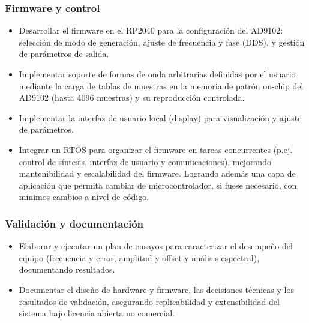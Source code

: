 \subsubsection{Firmware y control}
\begin{itemize}
	\item Desarrollar el firmware en el RP2040 para la configuración del AD9102: selección de modo de generación, ajuste de frecuencia y fase (DDS), y gestión de parámetros de salida.
	\item Implementar soporte de formas de onda arbitrarias definidas por el usuario mediante la carga de tablas de muestras en la memoria de patrón on-chip del AD9102 (hasta 4096 muestras) y su reproducción controlada.
	\item Implementar la interfaz de usuario local (display) para visualización y ajuste de parámetros.
 	\item Integrar un RTOS para organizar el firmware en tareas concurrentes (p.ej. control de síntesis, interfaz de usuario y comunicaciones), mejorando mantenibilidad y escalabilidad del firmware. Logrando además una capa de aplicación que permita cambiar de microcontrolador, si fuese necesario, con mínimos cambios a nivel de código. 
\end{itemize}

\subsubsection{Validación y documentación}
\begin{itemize}
	\item Elaborar y ejecutar un plan de ensayos para caracterizar el desempeño del equipo (frecuencia y error, amplitud y offset y análisis espectral), documentando resultados.
	\item Documentar el diseño de hardware y firmware, las decisiones técnicas y los resultados de validación, asegurando replicabilidad y extensibilidad del sistema bajo licencia abierta no comercial.
\end{itemize}

